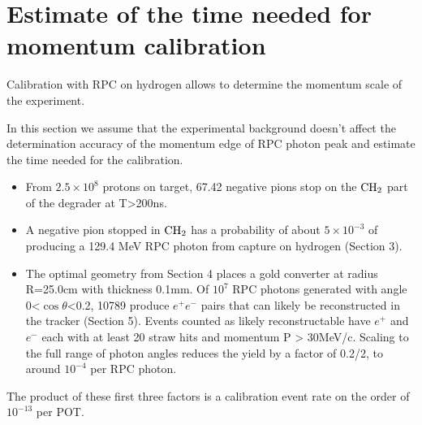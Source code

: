 
\section{Estimate of the time needed for momentum calibration}
Calibration with RPC on hydrogen allows to determine the momentum scale of the experiment.

In this section we assume that the experimental background doesn't affect
the determination accuracy of the momentum edge of RPC photon peak
and estimate the time needed for the calibration.

\begin{itemize}
\item 
From $ 2.5 \times 10^8 $ protons on target, 67.42 negative pions stop on the $\rm{CH_2}$ part of the degrader at T>200ns.
\item 
  A negative pion stopped in $\rm{CH_2}$ has a probability of about $ 5 \times 10^{-3} $ of producing a 129.4 MeV RPC photon from capture on hydrogen (Section 3).
\item 
The optimal geometry from Section 4 places a gold converter at radius R=25.0cm with thickness 0.1mm. Of $10^7$ RPC photons generated with angle 0<$\cos \theta$<0.2, 10789 produce $e^+ e^-$ pairs that can likely be reconstructed in the tracker (Section 5). Events counted as likely reconstructable have $e^+$ and $e^-$ each with at least 20 straw hits and momentum P > 30MeV/c. Scaling to the full range of photon angles reduces the yield by a factor of 0.2/2, to around $10^{-4}$  per RPC photon. 
\end{itemize}
The product of these first three factors is a calibration event rate on the order of $10^{-13} $ per POT.

